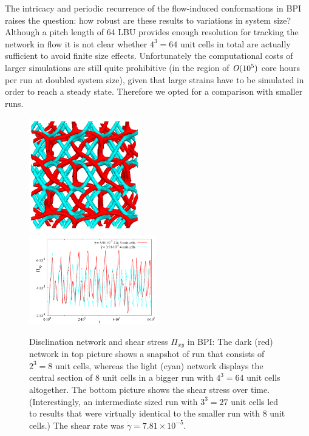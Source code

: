 \documentclass[8.5pt,twoside,twocolumn]{article}
\newcommand{\e}[1]{\times10^{#1}}
\newcommand{\gd}{\dot{\gamma}}
\begin{document}
The intricacy and periodic recurrence of the flow-induced conformations 
in BPI raises the question: how robust are these results to variations in 
system size? Although a pitch length of 64 LBU provides enough resolution 
for tracking the network in flow it is not clear whether $4^3=64$ unit cells 
in total are actually sufficient to avoid finite size effects.
Unfortunately the computational costs of larger simulations are still
quite prohibitive (in the region of ${\it O}(10^5)$ core hours per run at
doubled system size), given that large strains have to
be simulated in order to reach a steady state. Therefore we opted for a 
comparison with smaller runs.

\begin{figure}[htpb]
\includegraphics[width=0.43\textwidth]{disc+y-600k-run911_run1163.png}\\
\includegraphics[width=0.495\textwidth]{stress_bp1_2uc_4uc.pdf}
\caption{Disclination network and shear stress $\Pi_{xy}$ in BPI: 
The dark (red) network in top picture shows a snapshot of run that consists 
of $2^3=8$ unit cells, whereas the light (cyan) network displays the 
central section of 8 unit cells in a bigger run with $4^3=64$ unit cells altogether. 
The bottom picture shows the shear stress over time. (Interestingly, 
an intermediate sized run with $3^3=27$ unit cells led to results that 
were virtually identical to the smaller run with 8 unit cells.) 
The shear rate was $\gd=7.81\e{-5}$.
}
\label{bp1-2uc4uc}
\end{figure}
 
\end{document}
